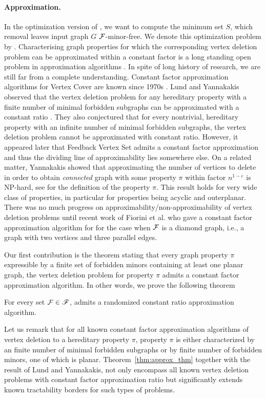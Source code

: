 \paragraph{Approximation.} In the optimization version of \fd{}, we want to 
compute the minimum set $S$, which removal leaves input graph $G$   ${\cal F}$-minor-free. We denote this optimization problem by \ofd.
Characterising graph  properties  for which the corresponding vertex deletion problem can be approximated 
within a constant factor is a long standing open problem in approximation algorithms  \cite{Yannakakis94}.
In spite of long history of research, we are still far from a complete understanding. 
Constant factor approximation algorithms  for  {\sc Vertex Cover}  are known since 1970s \cite{NemT74,Bar-YehudaE81}.
 Lund and Yannakakis observed that 
 the	vertex deletion	problem	for	any	hereditary	property	with	a finite number of minimal forbidden subgraphs can be approximated with a constant ratio \cite{LundY93}. They also conjectured that 
   for every nontrivial, hereditary property with an infinite number of minimal forbidden subgraphs, the  vertex deletion problem cannot be approximated with constant ratio.  However, it appeared later that   {\sc  Feedback Vertex Set} admits  a constant factor approximation~\cite{BarYGJ98,BafnaBF99}
  and thus  the dividing line of   approximability lies somewhere else.
  On a related matter, Yannakakis  \cite{Yannakakis79} showed that  approximating  the number of vertices to delete in order to obtain  \emph{connected} graph with some property $\pi$ within factor $n^{1-\varepsilon}$ is NP-hard, see
\cite{Yannakakis79} for the definition of the property $\pi$.  This result holds for very wide class of  properties, in particular for  properties  being acyclic and  outerplanar.  There was no much progress on approximability/non-approximability of vertex deletion  problems until recent work of Fiorini et al.  \cite{Fiorini:2009ipco} who gave  a constant factor approximation algorithm for 
 \fd{} for the case when ${\cal F}$ is a diamond graph, i.e., a graph with two vertices and three parallel edges.
 
Our  first contribution   is the theorem stating that  every graph property $\pi$ expressible by a finite set of forbidden minors containing at least one planar graph, the	vertex deletion	problem for property $\pi$ admits a constant factor approximation algorithm. In other words, we prove the following theorem
\begin{theorem}\label{thm:approx_thm}
For every set  ${\cal F} \in \mathscr{F}$, 
\ofd{}
admits a  randomized constant  ratio approximation algorithm. 
\end{theorem}
Let us remark that for all known constant factor approximation algorithms of vertex deletion to a  hereditary property $\pi$, property $\pi$ is either
  characterized by an   finite number of minimal forbidden subgraphs or by finite number of forbidden minors, one of which is planar.   Theorem~\ref{thm:approx_thm} together with the result of Lund and Yannakakis, not only encompass all known  vertex deletion problems with constant factor approximation ratio but significantly extends   known tractability 
  borders for   such types of problems.
 

